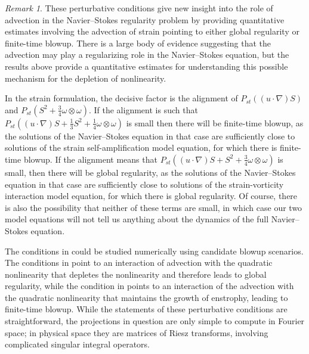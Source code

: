 \documentclass[11pt]{article}
\theoremstyle{plain}
\theoremstyle{remark}
\newtheorem{remark}[theorem]{Remark}
\numberwithin{equation}{section}
\begin{document}
\begin{remark}
These perturbative conditions give new insight into the role of advection in the Navier--Stokes regularity problem by providing quantitative estimates involving the advection of strain pointing to either global regularity or finite-time blowup. There is a large body of evidence suggesting that the advection may play a regularizing role in the Navier--Stokes equation, but the results above provide a quantitative estimates for understanding this possible mechanism for the depletion of nonlinearity. 

In the strain formulation, the decisive factor is the alignment of $P_{st}((u\cdot\nabla)S)$ and
$P_{st}\left(S^2+\frac{3}{4}\omega\otimes\omega\right)$.
If the alignment is such that 
$P_{st}\left((u\cdot\nabla)S+\frac{1}{3}S^2
+\frac{1}{4}\omega\otimes\omega\right)$
is small then there will be finite-time blowup, as the solutions of the Navier--Stokes equation in that case are sufficiently close to solutions of the strain self-amplification model equation, for which there is finite-time blowup.
If the alignment means that
$P_{st}\left((u\cdot\nabla)S+S^2
+\frac{3}{4}\omega\otimes\omega\right)$
is small, then there will be global regularity,
as the solutions of the Navier--Stokes equation in that case are sufficiently close to solutions of the strain-vorticity interaction model equation, for which there is global regularity.
Of course, there is also the possibility that neither of these terms are small, in which case our two model equations will not tell us anything about the dynamics of the full Navier--Stokes equation.

The conditions in 
could be studied numerically using candidate blowup scenarios. The conditions in  point to an interaction of advection with the quadratic nonlinearity that depletes the nonlinearity and therefore leads to global regularity, while the condition in  points to an interaction of the advection with the quadratic nonlinearity that maintains the growth of enstrophy, leading to finite-time blowup.
While the statements of these perturbative conditions are straightforward, the projections in question are only simple to compute in Fourier space; in physical space they are matrices of Riesz transforms, involving complicated singular integral operators.
\end{remark}
\end{document}
